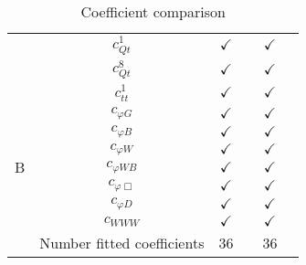 \documentclass{article}
\begin{document}
\begin{table}[H]
\begin{tabular}{|c|c|c|c|c|c|}
 & $c_{Qt}^{1}$ & $\checkmark$ &  & $\checkmark$ & \\ \cline{2-6}
 & $c_{Qt}^{8}$ & $\checkmark$ &  & $\checkmark$ & \\ \cline{2-6}
 & $c_{tt}^{1}$ & $\checkmark$ &  & $\checkmark$ &
\\ \hline
\multirow{7}{*}{B}
 & $c_{\varphi G}$ & $\checkmark$ &  & $\checkmark$ & \\ \cline{2-6}
 & $c_{\varphi B}$ & $\checkmark$ &  & $\checkmark$ & \\ \cline{2-6}
 & $c_{\varphi W}$ & $\checkmark$ &  & $\checkmark$ & \\ \cline{2-6}
 & $c_{\varphi WB}$ & $\checkmark$ &  & $\checkmark$ & \\ \cline{2-6}
 & $c_{\varphi \Box}$ & $\checkmark$ &  & $\checkmark$ & \\ \cline{2-6}
 & $c_{\varphi D}$ & $\checkmark$ &  & $\checkmark$ & \\ \cline{2-6}
 & $c_{WWW}$ & $\checkmark$ &  & $\checkmark$ &
\\ \hline
\hline & Number fitted coefficients & 36 &  & 36 &  \\ \hline
\end{tabular}
\caption{Coefficient comparison}
\end{table}
\end{document}

